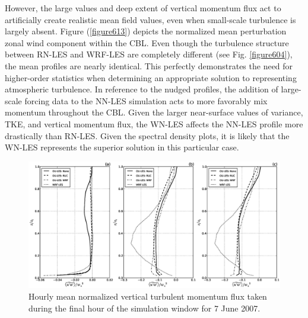 However, the large values and deep extent of vertical momentum flux act to artificially create realistic mean field values, even when small-scale turbulence is largely absent. Figure (\autoref{figure613}) depicts the normalized mean perturbation zonal wind component within the CBL. Even though the turbulence structure between RN-LES and WRF-LES are completely different (see Fig. \autoref{figure604}), the mean profiles are nearly identical. This perfectly demonstrates the need for higher-order statistics when determining an appropriate solution to representing atmospheric turbulence. In reference to the nudged profiles, the addition of large-scale forcing data to the NN-LES simulation acts to more favorably mix momentum throughout the CBL. Given the larger near-surface values of variance, TKE, and vertical momentum flux, the WN-LES affects the NN-LES profile more drastically than RN-LES. Given the spectral density plots, it is likely that the WN-LES represents the superior solution in this particular case.


\begin{figure}[H]
\begin{center}
\includegraphics[width=\textwidth]{figures/chapter6/stress13_20070607}
\end{center}
\caption{Hourly mean normalized vertical turbulent momentum flux taken during the final hour of the simulation window for 7 June 2007.}
\label{figure613}
\end{figure}



